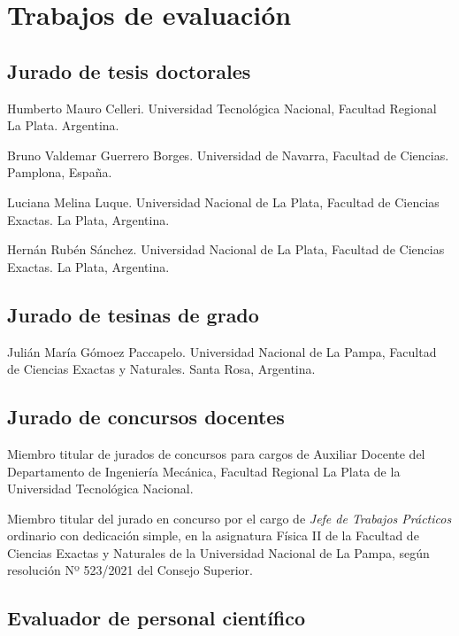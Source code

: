 \section{Trabajos de evaluación}

\subsection{Jurado de tesis doctorales}

 Humberto Mauro Celleri. Universidad Tecnológica Nacional, Facultad Regional La Plata. Argentina.

 Bruno Valdemar Guerrero Borges. Universidad de Navarra, Facultad de Ciencias. Pamplona, España.

 Luciana Melina Luque. Universidad Nacional de La Plata, Facultad de Ciencias Exactas. La Plata, Argentina.

 Hernán Rubén Sánchez. Universidad Nacional de La Plata, Facultad de Ciencias Exactas. La Plata, Argentina.

\subsection{Jurado de tesinas de grado}

 Julián María Gómoez Paccapelo. Universidad Nacional de La Pampa, Facultad de Ciencias Exactas y Naturales. Santa Rosa, Argentina.

\subsection{Jurado de concursos docentes}

 Miembro titular de jurados de concursos para cargos de Auxiliar Docente del Departamento de Ingeniería Mecánica, Facultad Regional La Plata de la Universidad Tecnológica Nacional.

 Miembro titular del jurado en concurso por el cargo de \textit{Jefe de Trabajos Prácticos} ordinario con dedicación simple, en la asignatura Física II de la Facultad de Ciencias Exactas y Naturales de la Universidad Nacional de La Pampa, según resolución Nº 523/2021 del Consejo Superior.


\subsection{Evaluador de personal científico}

